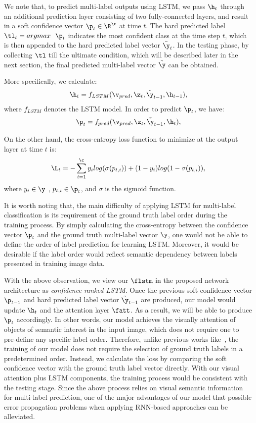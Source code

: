\documentclass[letterpaper]{article} %
\begin{document}
We note that, to predict multi-label outputs using LSTM, we pass $\h_t$ through an additional prediction layer consisting of two fully-connected layers, and result in a soft confidence vector $\p_t \in \R^\c$ at time $t$. The hard predicted label $\tl_t = argmax~~\p_t$ indicates the most confident class at the time step $t$, which is then appended to the hard predicted label vector $\tilde{\y}_t$. In the testing phase, by collecting $\tl$ till the ultimate condition, which will be described later in the next section, the final predicted multi-label vector $\tilde{\y}$ can be obtained.

More specifically, we calculate:
\begin{equation}
\label{eq:hidden}
\h_t = f_{LSTM}(\v_{pred}, \z_t, \tilde{\y}_{t-1}, \h_{t-1}),
\end{equation}
where $f_{LSTM}$ denotes the LSTM model. In order to predict $\p_t$, we have:
\begin{equation}
\label{eq:prob}
\p_t = f_{pred}(\v_{pred}, \z_t, \tilde{\y}_{t-1}, \h_t),
\end{equation}


On the other hand, the cross-entropy loss function to minimize at the output layer at time $t$ is:
\begin{equation}
\label{eq:loss}
\L_t = -\sum^{\c}_{i=1} y_i log(\sigma(p_{t,i})) + (1 - y_i)log(1 - \sigma(p_{t,i})),
\end{equation}
where $y_i \in \y$ , $p_{t,i} \in \p_t$, and $\sigma$ is the sigmoid function.

It is worth noting that, the main difficulty of applying LSTM for multi-label classification is its requirement of the ground truth label order during the training process. By simply calculating the cross-entropy between the confidence vector $\p_t$ and the ground truth multi-label vector $\y$, one would not be able to define the order of label prediction for learning LSTM. Moreover, it would be desirable if the label order would reflect semantic dependency between labels presented in training image data.

With the above observation, we view our $\flstm$ in the proposed network architecture as \emph{confidence-ranked LSTM}. Once the previous soft confidence vector $\p_{t-1}$ and hard predicted label vector $\tilde{\y}_{t-1}$ are produced, our model would update $\h_t$ and the attention layer $\fatt$. As a result, we will be able to produce $\p_{t}$ accordingly. In other words, our model achieves the visually attention of objects of semantic interest in the input image, which does not require one to pre-define any specific label order. Therefore, unlike previous works like~\cite{wang2016cnn}, the training of our model does not require the selection of ground truth labels in a predetermined order. Instead, we calculate the loss by comparing the soft confidence vector with the ground truth label vector directly. With our visual attention plus LSTM components, the training process would be consistent with the testing stage. Since the above process relies on visual semantic information for multi-label prediction, one of the major advantages of our model that possible error propagation problems when applying RNN-based approaches can be alleviated.
\end{document}
